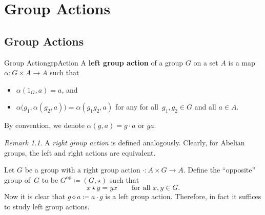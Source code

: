 \documentclass[math]{amznotes}
\theoremstyle{remark}
\newtheorem*{remark}{Remark}
\newcommand{\0}{\mathbf{0}}
\newcommand{\1}{\mathbf{1}}
\begin{document}
\chapter{Group Actions}
\section{Group Actions}
\begin{dfnbox}{Group Action}{grpAction}
    A {\color{red} \textbf{left group action}} of a group $G$ on a set $A$ is a map $\alpha \colon G \times A \to A$ such that
    \begin{itemize}
        \item $\alpha\left(1_G, a\right) = a$, and
        \item $\alpha\bigl(g_1, \alpha\left(g_2, a\right)\bigr) = \alpha\left(g_1g_2, a\right)$ for any for all~$g_1, g_2 \in G$ and all $a \in A$.
    \end{itemize}
    By convention, we denote $\alpha\left(g, a\right) = g \cdot a$ or $ga$.
\end{dfnbox}
\begin{notebox}
    \begin{remark}
        A \textit{right group action} is defined analogously. Clearly, for Abelian groups, the left and right actions are equivalent.
    \end{remark}
\end{notebox}
Let $G$ be a group with a right group action $\cdot \colon A \times G \to A$. Define the ``opposite'' group of~$G$ to be $G^{\mathrm{op}} \coloneqq \left(G, \star\right)$ such that 
\begin{equation*}
    x \star y = yx \qquad\textrm{for all } x, y \in G.
\end{equation*}
Now it is clear that $g \diamond a \coloneqq a \cdot g$ is a left group action. Therefore, in fact it suffices to study left group actions.
\end{document}
